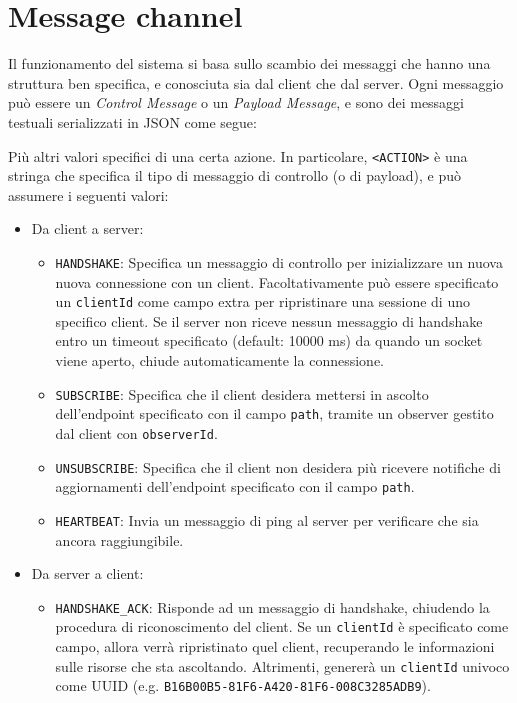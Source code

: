 \documentclass[12pt,a4paper,openright,twoside]{report}
\begin{document}
\section{Message channel}
Il funzionamento del sistema si basa sullo scambio dei messaggi che hanno una struttura ben specifica, e conosciuta sia dal client che dal server. Ogni messaggio può essere un \textit{Control Message} o un \textit{Payload Message}, e sono dei messaggi testuali serializzati in JSON come segue:

Più altri valori specifici di una certa azione. In particolare, \lstinline{<ACTION>} è una stringa che specifica il tipo di messaggio di controllo (o di payload), e può assumere i seguenti valori:
\begin{itemize}
\item Da client a server:
  \begin{itemize}
  \item \lstinline{HANDSHAKE}: Specifica un messaggio di controllo per inizializzare un nuova nuova connessione con un client. Facoltativamente può essere specificato un \lstinline{clientId} come campo extra per ripristinare una sessione di uno specifico client. Se il server non riceve nessun messaggio di handshake entro un timeout specificato (default: 10000 ms) da quando un socket viene aperto, chiude automaticamente la connessione.
  \item \lstinline{SUBSCRIBE}: Specifica che il client desidera mettersi in ascolto dell'endpoint specificato con il campo \lstinline{path}, tramite un observer gestito dal client con \lstinline{observerId}.
  \item \lstinline{UNSUBSCRIBE}: Specifica che il client non desidera più ricevere notifiche di aggiornamenti dell'endpoint specificato con il campo \lstinline{path}.
  \item \lstinline{HEARTBEAT}: Invia un messaggio di ping al server per verificare che sia ancora raggiungibile.
  \end{itemize}
\item Da server a client:
  \begin{itemize}
  \item \lstinline{HANDSHAKE_ACK}: Risponde ad un messaggio di handshake, chiudendo la procedura di riconoscimento del client. Se un \lstinline{clientId} è specificato come campo, allora verrà ripristinato quel client, recuperando le informazioni sulle risorse che sta ascoltando. Altrimenti, genererà un \lstinline{clientId} univoco come UUID (e.g. \lstinline{B16B00B5-81F6-A420-81F6-008C3285ADB9}).

\end{itemize}
\end{itemize}
\end{document}
